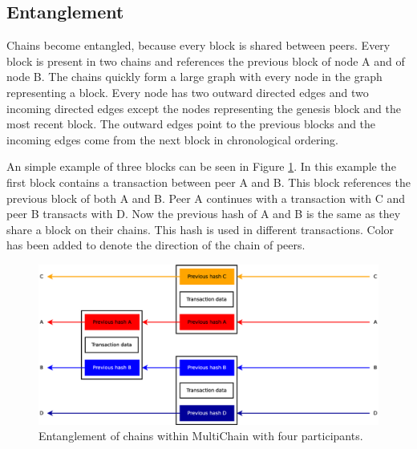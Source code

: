\subsection{Entanglement}
Chains become entangled, because every block is shared between peers.
Every block is present in two chains and references the previous block of node A and of node B.
The chains quickly form a large graph with every node in the graph representing a block.
Every node has two outward directed edges and two incoming directed edges
except the nodes representing the genesis block and the most recent block.
The outward edges point to the previous blocks
and the incoming edges come from the next block in chronological ordering.

An simple example of three blocks can be seen in Figure \ref{fig:chain-example}.
In this example the first block contains a transaction between peer A and B.
This block references the previous block of both A and B.
Peer A continues with a transaction with C and peer B transacts with D.
Now the previous hash of A and B is the same as they share a block on their chains.
This hash is used in different transactions.
Color has been added to denote the direction of the chain of peers.

\begin{figure}[ht]
	\centerline{\includegraphics[scale=0.3]{design/figs/entangled-chain.eps}}
	\caption{Entanglement of chains within MultiChain with four participants.}
	\label{fig:chain-example}
\end{figure}


